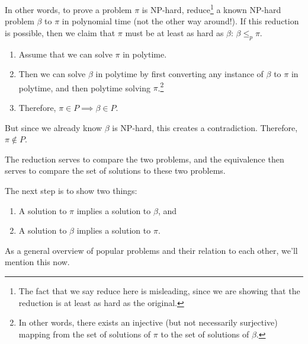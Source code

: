 \documentclass{article}
\begin{document}
    \begin{definition}[Reduction]
      In other words, to prove a problem $\pi$ is NP-hard, reduce\footnote{The fact that we say reduce here is misleading, since we are showing that the reduction is at least as hard as the original.} a known NP-hard problem $\beta$ to $\pi$ in polynomial time (not the other way around!). If this reduction is possible, then we claim that $\pi$ must be at least as hard as $\beta$: $\beta \leq_p \pi$. 
      \begin{enumerate}
        \item Assume that we can solve $\pi$ in polytime. 
        \item Then we can solve $\beta$ in polytime by first converting any instance of $\beta$ to $\pi$ in polytime, and then polytime solving $\pi$.\footnote{In other words, there exists an injective (but not necessarily surjective) mapping from the set of solutions of $\pi$ to the set of solutions of $\beta$. }
        \item Therefore, $\pi \in P \implies \beta \in P$. 
      \end{enumerate}
      But since we already know $\beta$ is NP-hard, this creates a contradiction. Therefore, $\pi \not\in P$. 
    \end{definition}

    The reduction serves to compare the two problems, and the equivalence then serves to compare the set of solutions to these two problems.   

    \begin{definition}
      The next step is to show two things: 
      \begin{enumerate}
        \item A solution to $\pi$ implies a solution to $\beta$, and 
        \item A solution to $\beta$ implies a solution to $\pi$. 
      \end{enumerate}
    \end{definition} 

    As a general overview of popular problems and their relation to each other, we'll mention this now. 
\end{document}
